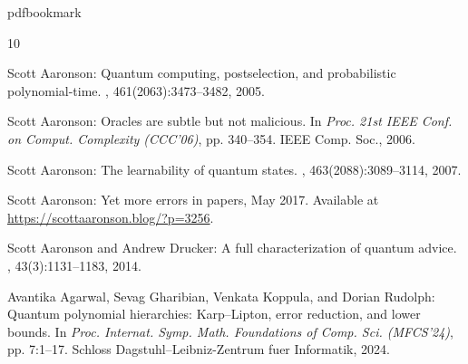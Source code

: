 \newcommand{\prelim}{Preliminary version in\ }\newcommand{\prelims}{Preliminary
  versions in\ } \newcommand{\QMAy}{\mathsf{QMA}}
  \newcommand{\PPy}{\mathsf{PP}}  \newcommand{\PHy}{\mathsf{PH}}
\providecommand{\bibhead}[1]{}
\expandafter\ifx\csname pdfbookmark\endcsname\relax%
  \providecommand{\tocrefpdfbookmark}{}
\else\providecommand{\tocrefpdfbookmark}{%
   \hypertarget{tocreferences}{}%
   \pdfbookmark[1]{References}{tocreferences}}%
\fi

\tocrefpdfbookmark
\begin{thebibliography}{10}

\bibhead{aaronson2005quantum}
{\sc Scott Aaronson}: Quantum computing, postselection, and probabilistic
  polynomial-time.
, 461(2063):3473--3482, 2005.

\bibhead{aaronson_subtle}
{\sc Scott Aaronson}: Oracles are subtle but not malicious.
\newblock In {\em Proc. 21st IEEE Conf. on Comput. Complexity (CCC'06)}, pp.
  340--354. IEEE Comp. Soc., 2006.

\bibhead{aaronson2007learnability}
{\sc Scott Aaronson}: The learnability of quantum states.
, 463(2088):3089--3114, 2007.

\bibhead{aaronsonBlogErrors2017}
{\sc Scott Aaronson}: Yet more errors in papers, May 2017.
\newblock Available at \url{https://scottaaronson.blog/?p=3256}.

\bibhead{aaronson2014full}
{\sc Scott Aaronson and Andrew Drucker}: A full characterization of quantum
  advice.
, 43(3):1131--1183, 2014.
\newblock [\epfmtdoi{10.1137/110856939}]

\bibhead{agarwal2024quantum}
{\sc Avantika Agarwal, Sevag Gharibian, Venkata Koppula, and Dorian Rudolph}:
  Quantum polynomial hierarchies: {K}arp--{L}ipton, error reduction, and lower
  bounds.
\newblock In {\em Proc. Internat. Symp. Math. Foundations of Comp. Sci.
  (MFCS'24)}, pp. 7:1--17. Schloss Dagstuhl--Leibniz-Zentrum fuer Informatik,
  2024.


\end{thebibliography}
